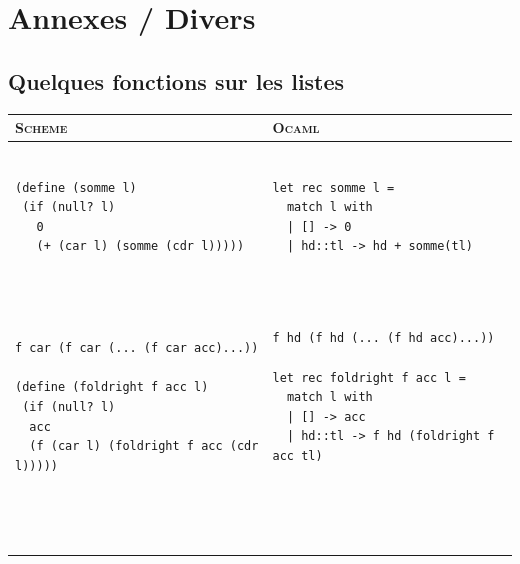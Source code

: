 \chapter{Annexes / Divers}
\section{Quelques fonctions sur les listes}
 
\begin{footnotesize}
\begin{tabular}{l|l} \hline
\textsc{Scheme} & \textsc{Ocaml} \\ \hline
\begin{minipage}{2.8in}
\begin{Verbatim}

(define (somme l)
 (if (null? l)
   0
   (+ (car l) (somme (cdr l)))))
   
\end{Verbatim}
\end{minipage}
&
\begin{minipage}{2.8in}
\begin{Verbatim}

let rec somme l =
  match l with
  | [] -> 0
  | hd::tl -> hd + somme(tl)  
  
\end{Verbatim} 
\end{minipage} \\ \hline
\begin{minipage}{2.8in}

\begin{Verbatim}

f car (f car (... (f car acc)...))

(define (foldright f acc l)
 (if (null? l)
  acc
  (f (car l) (foldright f acc (cdr l)))))
\end{Verbatim}
\end{minipage}
&
\begin{minipage}{2.8in}

\begin{Verbatim}

f hd (f hd (... (f hd acc)...))

let rec foldright f acc l =
  match l with
  | [] -> acc
  | hd::tl -> f hd (foldright f acc tl)
  
\end{Verbatim}
\end{minipage} \\ \hline
\begin{minipage}{2.8in}
\begin{Verbatim}


\end{Verbatim}
\end{minipage}
\end{tabular}
\end{footnotesize}
